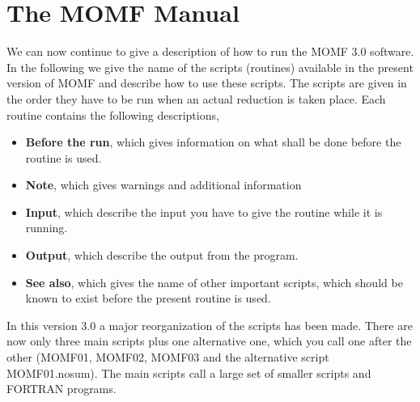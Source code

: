 \documentclass[]{article}
\begin{document}
\section{The MOMF Manual}
We can now continue to give a description of how to run the MOMF 3.0
software. In the following we give the name of the scripts (routines)
available in
the present version of MOMF and describe how to use these scripts. The
scripts are given in the order they have to be run when an actual
reduction is taken place. Each routine contains the following
descriptions,
\begin{itemize}
\item {\bf Before the run}, which gives information on what shall be done
before the routine is used.
\item {\bf Note}, which gives warnings and additional information
\item {\bf Input}, which describe the input you have to give the routine
while it is running.
\item {\bf Output}, which describe the output from the program.
\item {\bf See also}, which gives the name of other important scripts, which
should be known to exist before the present routine is used.
\end{itemize}

In this version 3.0 a major reorganization of the scripts has been made.
There are now only three main scripts plus one alternative one, which
you call one after the other (MOMF01, MOMF02, MOMF03 and the alternative
script MOMF01.nosum). The main scripts call a large set of
smaller scripts and FORTRAN programs.
\end{document}
